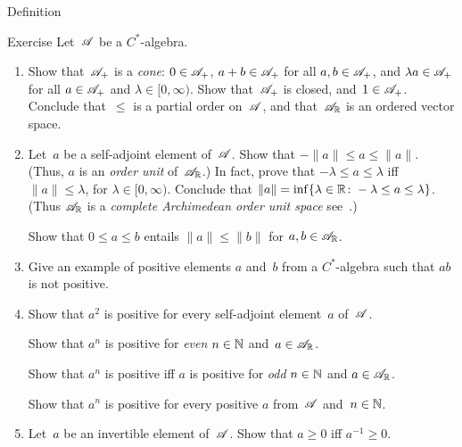 \documentclass[main]{subfiles}
\begin{document}
\begin{parsec}
\begin{point}{Definition}
\begin{point}{Exercise}%
Let~$\mathscr{A}$ be a $C^*$-algebra.
\begin{enumerate}
\item
Show that~$\mathscr{A}_{+}$ is a \emph{cone}:
$0\in \mathscr{A}_{+}$,
$a+b\in \mathscr{A}_{+}$ for all $a,b\in\mathscr{A}_{+}$,
and
$\lambda a\in \mathscr{A}_{+}$  
for all $a\in \mathscr{A}_{+}$ and $\lambda\in [0,\infty)$.
Show that~$\mathscr{A}_{+}$ is closed,
and~$1\in\mathscr{A}_{+}$.
Conclude that~$\leq$ is a partial order on~$\mathscr{A}$,
and that~$\mathscr{A}_{\mathbb{R}}$ is an ordered vector space.
\item
Let~$a$ be a self-adjoint element of~$\mathscr{A}$.
Show that $-\|a\|\leq a \leq \|a\|$.
(Thus, $a$ is an \emph{order unit} of~$\mathscr{A}_{\mathbb{R}}$.)
In fact, prove that
 $-\lambda \leq a\leq \lambda$
iff $\|a\|\leq \lambda$,
for $\lambda\in [0,\infty)$.
Conclude that $\|a\| = \inf\{ \lambda \in \mathbb{R}\colon 
-\lambda \leq a\leq \lambda\}$.
(Thus $\mathscr{A}_{\mathbb{R}}$ is a \emph{complete Archimedean order unit space}
see~\TODO{}.)

Show that $0\leq a \leq b$ entails $\|a\|\leq \|b\|$
for $a,b\in\mathscr{A}_{\mathbb{R}}$.

\item
Give an example of positive elements $a$ and~$b$
from a $C^*$-algebra
such that $ab$ is not positive.

\item 
Show that $a^2$ is positive for every self-adjoint element~$a$ of~$\mathscr{A}$.

Show that $a^n$ is positive for \emph{even} $n\in \mathbb{N}$ and~$a\in\mathscr{A}_{\mathbb{R}}$.

Show that $a^n$ is positive iff $a$ is positive for \emph{odd} $n\in \mathbb{N}$
and $a\in\mathscr{A}_{\mathbb{R}}$.

Show that $a^n$ is positive
for every positive $a$ from~$\mathscr{A}$ and~$n\in \mathbb{N}$.
\item
Let~$a$ be an invertible element of~$\mathscr{A}$.
Show that $a\geq 0$ iff $a^{-1}\geq 0$.


\end{enumerate}
\end{point}
\end{point}
\end{parsec}
\end{document}
